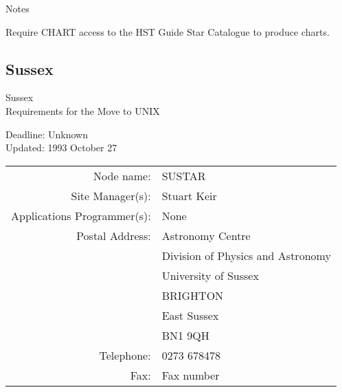 \vspace{5mm}
\begin{center}
{\large\sc Notes}
\end{center}

Require CHART access to the HST Guide Star Catalogue to produce charts.

\newpage
\subsection{Sussex}

\renewcommand{\starsitename}{Sussex}
\renewcommand{\starnodename}{SUSTAR}

\renewcommand{\starunixdate}{Unknown}
\renewcommand{\starupdate}{1993 October 27}

\renewcommand{\starsitetelephone}{0273 678478}
\renewcommand{\starsitefax}{Fax number}

\begin{center}
{\Large\sc \starsitename \\ [2ex]
           Requirements for the Move to UNIX}

\vspace{3mm}
{\large\sc Deadline: \starunixdate \\ [1ex]
           Updated: \starupdate}
\end{center}

\vspace{5mm}

\begin{center}
\begin{tabular}{rl}
{\sc Node name:}                  & \starnodename \\
{\sc Site Manager(s):}            & Stuart Keir \\
{\sc Applications Programmer(s):} & None \\
{\sc Postal Address:}             & Astronomy Centre \\
                                  & Division of Physics and Astronomy \\
                                  & University of Sussex \\
                                  & BRIGHTON \\
                                  & East Sussex \\
                                  & BN1 9QH \\
{\sc Telephone:}                  & \starsitetelephone \\
{\sc Fax:}                        & \starsitefax \\
\end{tabular}
\end{center}

